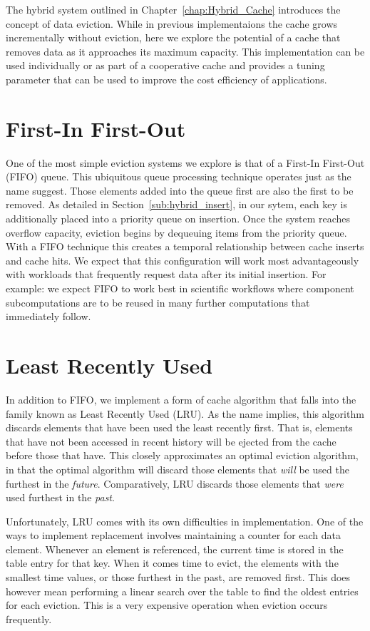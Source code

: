 The hybrid system outlined in Chapter~\ref{chap:Hybrid_Cache} introduces the
concept of data eviction. While in previous implementaions the cache grows
incrementally without eviction, here we explore the potential of a cache that
removes data as it approaches its maximum capacity. This implementation can be
used individually or as part of a cooperative cache and provides a tuning
parameter that can be used to improve the cost efficiency of applications.

\section{First-In First-Out} %
\label{sec:fifo}
One of the most simple eviction systems we explore is that of a First-In
First-Out (FIFO) queue. This ubiquitous queue processing technique operates
just as the name suggest. Those elements added into the queue first are also
the first to be removed. As detailed in Section~\ref{sub:hybrid_insert}, in our
sytem, each key is additionally placed into a priority queue on insertion. Once
the system reaches overflow capacity, eviction begins by dequeuing items from
the priority queue. With a FIFO technique this creates a temporal relationship
between cache inserts and cache hits. We expect that this configuration will
work most advantageously with workloads that frequently request data after its
initial insertion. For example: we expect FIFO to work best in scientific
workflows where component subcomputations are to be reused in many further
computations that immediately follow.


\section{Least Recently Used} %
\label{sec:lru}
In addition to FIFO, we implement a form of cache algorithm that falls into the
family known as Least Recently Used (LRU). As the name implies, this algorithm
discards elements that have been used the least recently first. That is,
elements that have not been accessed in recent history will be ejected from the
cache before those that have. This closely approximates an optimal eviction
algorithm, in that the optimal algorithm will discard those elements that
\emph{will} be used the furthest in the \emph{future}. Comparatively, LRU
discards those elements that \emph{were} used furthest in the \emph{past}.

Unfortunately, LRU comes with its own difficulties in implementation.
One of the ways to implement replacement involves maintaining a counter for
each data element. Whenever an element is referenced, the current time is
stored in the table entry for that key. When it comes time to evict, the
elements with the smallest time values, or those furthest in the past, are
removed first. This does however mean performing a linear search over the table
to find the oldest entries for each eviction. This is a very expensive
operation when eviction occurs frequently.

